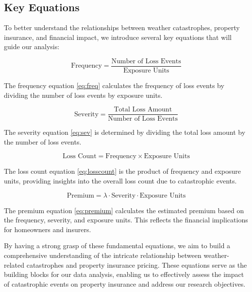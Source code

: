 \documentclass[12pt]{article}
\begin{document}
        
    
\subsection{Key Equations}

To better understand the relationships between weather catastrophes, property insurance, and financial impact, we introduce several 
key equations that will guide our analysis:

\begin{equation}
    \label{eq:freq}
    \text{Frequency} = \frac{\text{Number of Loss Events}}{\text{Exposure Units}}
\end{equation}

The frequency equation \ref{eq:freq} calculates the frequency of loss events by dividing the number of loss events by exposure units.

\begin{equation}
    \label{eq:sev}
    \text{Severity} = \frac{\text{Total Loss Amount}}{\text{Number of Loss Events}}
\end{equation}

The severity equation \ref{eq:sev} is determined by dividing the total loss amount by the number of loss events.

\begin{equation}
    \label{eq:losscount}
    \text{Loss Count} = \text{Frequency} \times \text{Exposure Units}
\end{equation}

The loss count equation \ref{eq:losscount} is the product of frequency and exposure units, providing insights into the overall loss count due to catastrophic events.

\begin{equation}
    \label{eq:premium}
    \text{Premium} = \lambda \cdot \text{Severity} \cdot \text{Exposure Units}
\end{equation}

The premium equation \ref{eq:premium} calculates the estimated premium based on the frequency, severity, and exposure units. This 
reflects the financial implications for homeowners and insurers.

By having a strong grasp of these fundamental equations, we aim to build a comprehensive understanding of the intricate relationship 
between weather-related catastrophes and property insurance pricing. These equations serve as the building blocks for our data 
analysis, enabling us to effectively assess the impact of catastrophic events on property insurance and address our research 
objectives.
\end{document}
